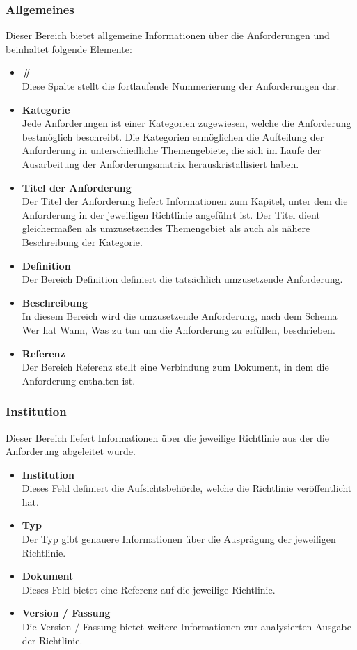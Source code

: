 \subsubsection{Allgemeines}
Dieser Bereich bietet allgemeine Informationen über die Anforderungen und beinhaltet folgende Elemente:
\bigbreak
\begin{itemize}
    \item \textbf{\#} \\
    Diese Spalte stellt die fortlaufende Nummerierung der Anforderungen dar.
    \item \textbf{Kategorie}\\
    Jede Anforderungen ist einer Kategorien zugewiesen, welche die Anforderung bestmöglich beschreibt. Die Kategorien ermöglichen die Aufteilung der Anforderung in unterschiedliche Themengebiete, die sich im Laufe der Ausarbeitung der Anforderungsmatrix herauskristallisiert haben. 
    \item \textbf{Titel der Anforderung}\\
    Der \glqq{}Titel der Anforderung\grqq{} liefert Informationen zum Kapitel, unter dem die Anforderung in der jeweiligen Richtlinie angeführt ist. Der Titel dient gleichermaßen als umzusetzendes Themengebiet als auch als nähere Beschreibung der Kategorie.
    \item \textbf{Definition}\\
    Der Bereich \glqq{}Definition\grqq{} definiert die tatsächlich umzusetzende Anforderung. 
    \item \textbf{Beschreibung}\\
    In diesem Bereich wird die umzusetzende Anforderung, nach dem Schema \glqq{}Wer\grqq{} hat \glqq{}Wann\grqq{}, \glqq{}Was\grqq{} zu tun um die Anforderung zu erfüllen, beschrieben.
    \item \textbf{Referenz}\\
    Der Bereich \glqq{}Referenz\grqq{} stellt eine Verbindung zum Dokument, in dem die Anforderung enthalten ist.
\end{itemize}
\bigbreak
\subsubsection{Institution}
Dieser Bereich liefert Informationen über die jeweilige Richtlinie aus der die Anforderung abgeleitet wurde. 
\begin{itemize}
    \item \textbf{Institution}\\
    Dieses Feld definiert die Aufsichtsbehörde, welche die Richtlinie veröffentlicht hat.
    \item \textbf{Typ}\\
    Der \glqq{}Typ\grqq{} gibt genauere Informationen über die Ausprägung der jeweiligen Richtlinie.
    \item \textbf{Dokument}\\
    Dieses Feld bietet eine Referenz auf die jeweilige Richtlinie.
    \item \textbf{Version / Fassung}\\
    Die Version / Fassung bietet weitere Informationen zur analysierten Ausgabe der Richtlinie.
\end{itemize}
\bigbreak

